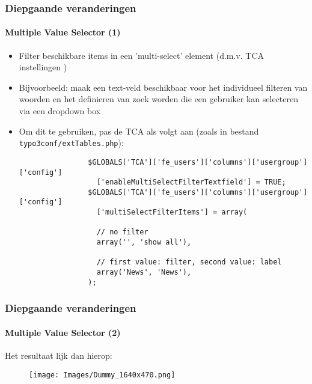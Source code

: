 \begin{frame}[fragile]
	\frametitle{Diepgaande veranderingen}
	\framesubtitle{Multiple Value Selector (1)}

	\begin{itemize}
		\item Filter beschikbare items in een 'multi-select' element (d.m.v. TCA instellingen )
		\item Bijvoorbeeld: maak een text-veld beschikbaar voor het individueel filteren van woorden en het definieren van zoek worden die een gebruiker kan selecteren via een dropdown box

		\item Om dit te gebruiken, pas de TCA als volgt aan\newline
			(zoals in bestand \texttt{typo3conf/extTables.php}):

			\lstset{
				basicstyle=\tiny\ttfamily
			}

			\begin{lstlisting}
				$GLOBALS['TCA']['fe_users']['columns']['usergroup']['config']
				  ['enableMultiSelectFilterTextfield'] = TRUE;
				$GLOBALS['TCA']['fe_users']['columns']['usergroup']['config']
				  ['multiSelectFilterItems'] = array(

				  // no filter
				  array('', 'show all'),

				  // first value: filter, second value: label
				  array('News', 'News'),
				);
			\end{lstlisting}

	\end{itemize}

\end{frame}


\begin{frame}[fragile]
	\frametitle{Diepgaande veranderingen}
	\framesubtitle{Multiple Value Selector (2)}

	Het resultaat lijk dan hierop:

	\begin{figure}
		\texttt{[image: Images/Dummy\_1640x470.png]}
	\end{figure}

\end{frame}

